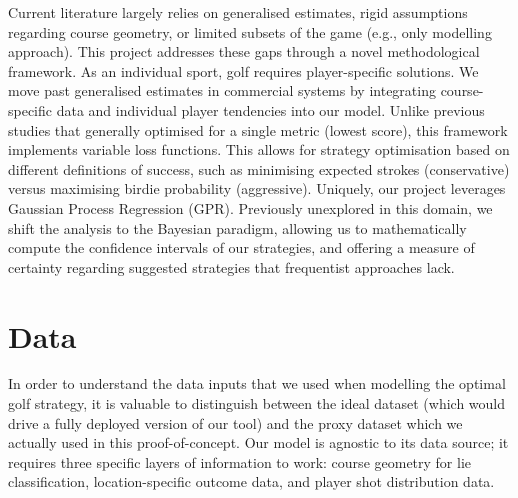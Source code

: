 \documentclass[11pt, letterpaper]{article}
\begin{document}
Current literature largely relies on generalised estimates, rigid assumptions regarding course geometry, or limited subsets of the game (e.g., only modelling approach). This project addresses these gaps through a novel methodological framework. As an individual sport, golf requires player-specific solutions. We move past generalised estimates in commercial systems by integrating course-specific data and individual player tendencies into our model. Unlike previous studies that generally optimised for a single metric (lowest score), this framework implements variable loss functions. This allows for strategy optimisation based on different definitions of success, such as minimising expected strokes (conservative) versus maximising birdie probability (aggressive). Uniquely, our project leverages Gaussian Process Regression (GPR). Previously unexplored in this domain, we shift the analysis to the Bayesian paradigm, allowing us to mathematically compute the confidence intervals of our strategies, and offering a measure of certainty regarding suggested strategies that frequentist approaches lack.

\section{Data}
\label{sec:Data}

In order to understand the data inputs that we used when modelling the optimal golf strategy, it is valuable to distinguish between the ideal dataset (which would drive a fully deployed version of our tool) and the proxy dataset which we actually used in this proof-of-concept. Our model is agnostic to its data source; it requires three specific layers of information to work: course geometry for lie classification, location-specific outcome data, and player shot distribution data.
\end{document}
